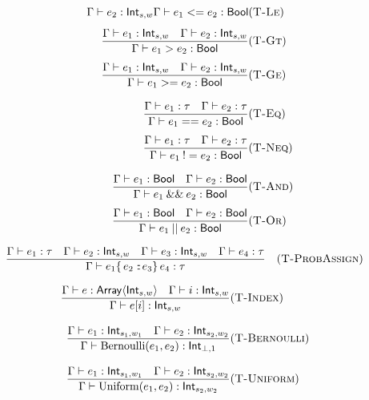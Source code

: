 \begin{multicols}{2}
\[\begin{aligned}
{        \quad
        \Gamma \vdash e_2 : \mathsf{Int}_{s,w}}
      {\Gamma \vdash e_1 <= e_2 : \mathsf{Bool}}
       & (\textsc{T-Le})  \\[1ex]
      \frac{\Gamma \vdash e_1 : \mathsf{Int}_{s,w}
        \quad
        \Gamma \vdash e_2 : \mathsf{Int}_{s,w}}
      {\Gamma \vdash e_1 > e_2   : \mathsf{Bool}}
       & (\textsc{T-Gt})  \\[1ex]
      \frac{\Gamma \vdash e_1 : \mathsf{Int}_{s,w}
        \quad
        \Gamma \vdash e_2 : \mathsf{Int}_{s,w}}
      {\Gamma \vdash e_1 >= e_2 : \mathsf{Bool}}
       & (\textsc{T-Ge})  \\[2ex]
      \frac{\Gamma \vdash e_1 : \tau
        \quad
        \Gamma \vdash e_2 : \tau}
      {\Gamma \vdash e_1 == e_2 : \mathsf{Bool}}
       & (\textsc{T-Eq})  \\[1ex]
      \frac{\Gamma \vdash e_1 : \tau
        \quad
        \Gamma \vdash e_2 : \tau}
      {\Gamma \vdash e_1 \:!= e_2 : \mathsf{Bool}}
       & (\textsc{T-Neq}) \\[2ex]
      \frac{\Gamma \vdash e_1 : \mathsf{Bool}
        \quad
        \Gamma \vdash e_2 : \mathsf{Bool}}
      {\Gamma \vdash e_1 \:\&\&\: e_2 : \mathsf{Bool}}
       & (\textsc{T-And}) \\[1ex]
      \frac{\Gamma \vdash e_1 : \mathsf{Bool}
        \quad
        \Gamma \vdash e_2 : \mathsf{Bool}}
      {\Gamma \vdash e_1 \:||\: e_2 : \mathsf{Bool}}
       & (\textsc{T-Or})
    \end{aligned}
  \]
\end{multicols}

\[
  \frac{
    \Gamma \vdash e_1 : \tau
    \quad
    \Gamma \vdash e_2 : \mathsf{Int}_{s,w}
    \quad
    \Gamma \vdash e_3 : \mathsf{Int}_{s,w}
    \quad
    \Gamma \vdash e_4 : \tau
  }
  {\Gamma \vdash e_1 \{\,e_2 :\!:\! e_3\}\, e_4 : \tau}
  \quad(\textsc{T-ProbAssign})
\]

\[
  \begin{aligned}
    \frac{\Gamma\vdash e : \mathsf{Array}\langle\mathsf{Int}_{s,w}\rangle
      \quad
      \Gamma\vdash i : \mathsf{Int}_{s,w}}
    {\Gamma\vdash e[i] : \mathsf{Int}_{s,w}}
     & (\textsc{T-Index})     \\[2ex]
    \frac{\Gamma \vdash e_1 : \mathsf{Int}_{s_1,w_1}
      \quad
      \Gamma \vdash e_2 : \mathsf{Int}_{s_2,w_2}}
    {\Gamma \vdash \mathrm{Bernoulli}(e_1,e_2) : \mathsf{Int}_{\bot,1}}
     & (\textsc{T-Bernoulli}) \\[2ex]
    \frac{\Gamma \vdash e_1 : \mathsf{Int}_{s_1,w_1}
      \quad
      \Gamma \vdash e_2 : \mathsf{Int}_{s_2,w_2}}
    {\Gamma \vdash \mathrm{Uniform}(e_1,e_2) : \mathsf{Int}_{s_2,w_2}}
     & (\textsc{T-Uniform})
  \end{aligned}
\]
